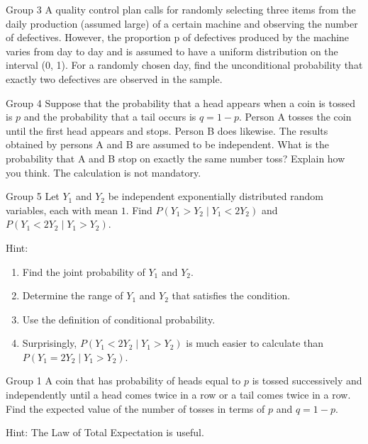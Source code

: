 \documentclass{article}
\begin{document}
\begin{problem}
    {Group 3}
    A quality control plan calls for randomly selecting three items from the daily production (assumed large) of a certain machine and observing the number of defectives. However, the proportion p of defectives produced by the machine varies from day to day and is assumed to have a uniform distribution on the interval (0, 1). For a randomly chosen day, find the unconditional probability that exactly two defectives are observed in the sample.
\end{problem}

\begin{problem}
    {Group 4}
    Suppose that the probability that a head appears when a coin is tossed is $p$ and the probability that a tail occurs is $q = 1 - p$. Person A tosses the coin until the first head appears and stops. Person B does likewise. The results obtained by persons A and B are assumed to be independent. What is the probability that A and B stop on exactly the same number toss? Explain how you think. The calculation is not mandatory.
\end{problem}

\begin{problem}
    {Group 5}
    Let $Y_1$ and $Y_2$ be independent exponentially distributed random variables, each with mean $1$. Find $P( Y_1 > Y_2 \mid Y_1 < 2Y_2)$ and $P( Y_1 < 2Y_2 \mid Y_1 > Y_2)$.
    \begin{solution}
        {Hint:}
        \begin{enumerate}
            \item Find the joint probability of $Y_1$ and $Y_2$.
            \item Determine the range of $Y_1$ and $Y_2$ that satisfies the condition.
            \item Use the definition of conditional probability.
            \item Surprisingly, $P( Y_1 < 2Y_2 \mid Y_1 > Y_2)$ is much easier to calculate than $P( Y_1 = 2Y_2 \mid Y_1 > Y_2)$.
        \end{enumerate}
    \end{solution}
\end{problem}
\iffalse
\begin{problem}
    {Group 1}
    A coin that has probability of heads equal to $p$ is tossed successively and independently until a head comes twice in a row or a tail comes twice in a row. Find the expected value of the number of tosses in terms of $p$ and $q=1-p$.
    \begin{solution}
        {Hint:}
        The Law of Total Expectation is useful.
    \end{solution}
\end{problem}
\end{document}
